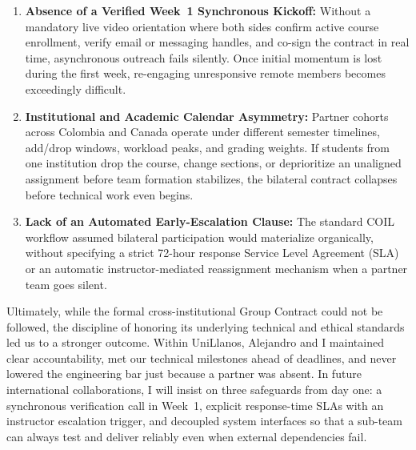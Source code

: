 \begin{enumerate}[leftmargin=1.4em, itemsep=4pt]
    \item \textbf{Absence of a Verified Week~1 Synchronous Kickoff:} Without a mandatory live video orientation where both sides confirm active course enrollment, verify email or messaging handles, and co-sign the contract in real time, asynchronous outreach fails silently. Once initial momentum is lost during the first week, re-engaging unresponsive remote members becomes exceedingly difficult.
    \item \textbf{Institutional and Academic Calendar Asymmetry:} Partner cohorts across Colombia and Canada operate under different semester timelines, add/drop windows, workload peaks, and grading weights. If students from one institution drop the course, change sections, or deprioritize an unaligned assignment before team formation stabilizes, the bilateral contract collapses before technical work even begins.
    \item \textbf{Lack of an Automated Early-Escalation Clause:} The standard COIL workflow assumed bilateral participation would materialize organically, without specifying a strict 72-hour response Service Level Agreement (SLA) or an automatic instructor-mediated reassignment mechanism when a partner team goes silent.
\end{enumerate}

Ultimately, while the formal cross-institutional Group Contract could not be followed, the discipline of honoring its underlying technical and ethical standards led us to a stronger outcome. Within UniLlanos, Alejandro and I maintained clear accountability, met our technical milestones ahead of deadlines, and never lowered the engineering bar just because a partner was absent. In future international collaborations, I will insist on three safeguards from day one: a synchronous verification call in Week~1, explicit response-time SLAs with an instructor escalation trigger, and decoupled system interfaces so that a sub-team can always test and deliver reliably even when external dependencies fail.
